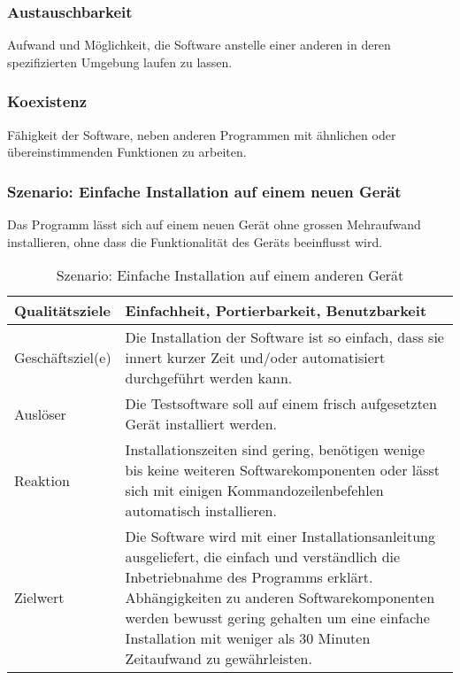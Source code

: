 \documentclass[
	ngerman,
	toc=listof, %
	toc=bibliography, %
	footnotes=multiple, %
	parskip=half, %
	numbers=noendperiod %
]{scrartcl}
\begin{document}
		\subsubsection{Austauschbarkeit}
		Aufwand und Möglichkeit, die Software anstelle einer anderen in deren spezifizierten Umgebung laufen zu lassen.

		\subsubsection{Koexistenz}
		Fähigkeit der Software, neben anderen Programmen mit ähnlichen oder übereinstimmenden Funktionen zu arbeiten.

		\subsubsection{Szenario: Einfache Installation auf einem neuen Gerät}
		Das Programm lässt sich auf einem neuen Gerät ohne grossen Mehraufwand installieren, ohne dass die Funktionalität des Geräts beeinflusst wird.
		
		\begin{table}[!h]
			\begin{tabularx}{\textwidth}{lX}
				\toprule
				Qualitätsziele & Einfachheit, Portierbarkeit, Benutzbarkeit  \\
				\midrule
				Geschäftsziel(e) & Die Installation der Software ist so einfach, dass sie innert kurzer Zeit und/oder automatisiert durchgeführt werden kann.  \\
				\midrule
				Auslöser & Die Testsoftware soll auf einem frisch aufgesetzten Gerät installiert werden.  \\
				\midrule
				Reaktion & Installationszeiten sind gering, benötigen wenige bis keine weiteren Softwarekomponenten oder lässt sich mit einigen Kommandozeilenbefehlen automatisch installieren.  \\
				\midrule
				Zielwert & Die Software wird mit einer Installationsanleitung ausgeliefert, die einfach und verständlich die Inbetriebnahme des Programms erklärt. Abhängigkeiten zu anderen Softwarekomponenten werden bewusst gering gehalten um eine einfache Installation mit weniger als 30 Minuten Zeitaufwand zu gewährleisten.  \\
				\bottomrule
			\end{tabularx}
			\caption{Szenario: Einfache Installation auf einem anderen Gerät}
		\end{table}
		
\end{document}
